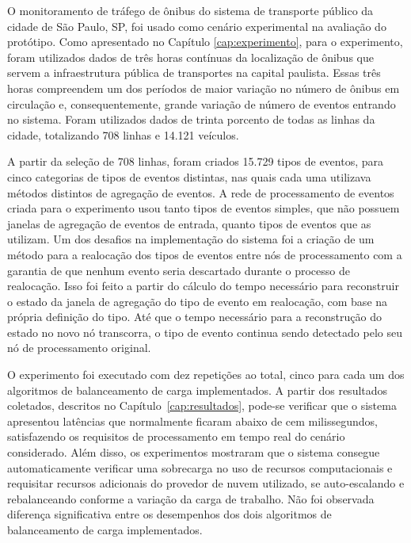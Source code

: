 O monitoramento de tráfego de ônibus do sistema de transporte
público da cidade de São Paulo, SP, foi usado como cenário experimental na avaliação do protótipo. Como apresentado no Capítulo \ref{cap:experimento}, para o experimento, foram utilizados dados de três horas contínuas da localização de ônibus que servem a infraestrutura pública de transportes na capital paulista. Essas três horas compreendem um dos períodos de maior variação no número de ônibus em circulação e, consequentemente, grande variação de número de eventos entrando no sistema. Foram utilizados dados de trinta porcento de todas as linhas da cidade, totalizando 708 linhas e 14.121 veículos. %

A partir da seleção de 708 linhas, foram criados 15.729 tipos de eventos, para cinco categorias de tipos de eventos distintas, nas quais cada uma utilizava métodos distintos de agregação de eventos. A rede de processamento de eventos criada para o experimento usou tanto tipos de eventos simples, que não possuem janelas de agregação de eventos de entrada, quanto tipos de eventos que as utilizam. Um dos desafios na implementação do sistema foi a criação de um método para a realocação dos tipos de eventos entre nós de processamento com a garantia de que nenhum evento seria descartado durante o processo de realocação. Isso foi feito a partir do cálculo do tempo necessário para reconstruir o estado da janela de agregação do tipo de evento em realocação, com base na própria definição do tipo. Até que o tempo necessário para a reconstrução do estado no novo nó transcorra, o tipo de evento continua sendo detectado pelo seu nó de processamento original.

O experimento foi executado com dez repetições ao total, cinco para cada um dos algoritmos de balanceamento de carga implementados. A partir dos resultados coletados, descritos no Capítulo~\ref{cap:resultados}, pode-se verificar que o sistema apresentou latências que normalmente ficaram abaixo de cem milissegundos,  satisfazendo os requisitos de processamento em tempo real do cenário considerado. Além disso, os experimentos mostraram que o sistema consegue automaticamente verificar uma sobrecarga no uso de recursos computacionais e requisitar recursos adicionais do provedor de nuvem utilizado, se auto-escalando e rebalanceando conforme a variação da carga de trabalho. Não foi observada diferença significativa entre os desempenhos dos dois algoritmos de balanceamento de carga implementados.


